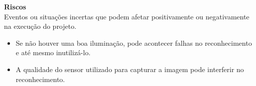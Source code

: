 \textbf{Riscos} \\
Eventos ou situações incertas que podem afetar positivamente ou negativamente na execução do projeto.
\begin{itemize}
\raggedright \item Se não houver uma boa iluminação, pode acontecer falhas no reconhecimento e até mesmo inutilizá-lo.
\raggedright \item A qualidade do sensor utilizado para capturar a imagem pode interferir no reconhecimento.
\end{itemize}